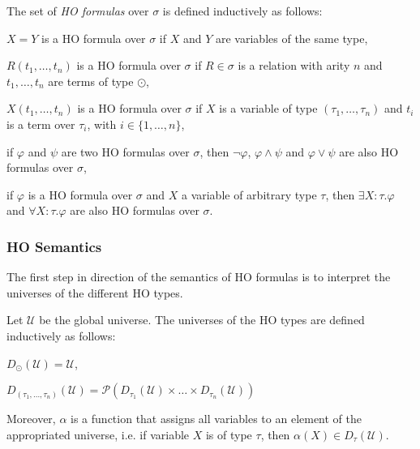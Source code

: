 \begin{definition}
    The set of \emph{HO formulas} over $\sigma$ is defined inductively as follows:
    \begin{compactitem}
        \item $X = Y$ is a HO formula over $\sigma$ if $X$ and $Y$ are variables of the same type,
        \item $R(t_1, \dots, t_n)$ is a HO formula over $\sigma$ if $R \in \sigma$ is a relation with arity $n$ and
        $t_1, \dots, t_n$ are terms of type $\odot$,
        \item $X(t_1, \dots, t_n)$ is a HO formula over $\sigma$ if $X$ is a variable of type $(\tau_1, \dots, \tau_n)$
        and $t_i$ is a term over $\tau_i$, with $i \in \{1, \dots, n\}$,
        \item if $\varphi$ and $\psi$ are two HO formulas over $\sigma$, then $\neg\varphi$, $\varphi\wedge\psi$ and $\varphi
        \vee \psi$ are also HO formulas over $\sigma$,
        \item if $\varphi$ is a HO formula over $\sigma$ and $X$ a variable of arbitrary type $\tau$, then $\exists
        X:\tau.\varphi$ and
        $\forall X:\tau.\varphi$ are also HO formulas over $\sigma$.
    \end{compactitem}
\end{definition}

\subsubsection{HO Semantics}

The first step in direction of the semantics of HO formulas is to interpret the universes of the different HO types.

\begin{definition}
    Let $\mathcal{U}$ be the global universe. The universes of the HO types are defined inductively as follows:
    \begin{compactitem}
        \item $D_\odot(\mathcal{U}) = \mathcal{U}$,
        \item $D_{(\tau_1, \dots, \tau_n)}(\mathcal{U}) = \mathcal{P}(D_{\tau_1}(\mathcal{U}) \times \dots \times
        D_{\tau_n}(\mathcal{U}))$
    \end{compactitem}
\end{definition}

Moreover, $\alpha$ is a function that assigns all variables to an element of the appropriated universe, i.e. if
variable $X$ is of type $\tau$, then $\alpha(X) \in D_{\tau}(\mathcal{U})$.

